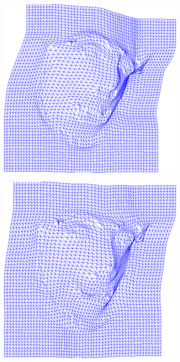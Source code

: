 \begin{figure}[t!]
\begin{subfigure}[b]{0.15\textwidth}
    \end{subfigure}
    \hfill
    \begin{subfigure}[b]{0.15\textwidth}
            \includegraphics[width=\textwidth]{resources/Fig_Flows/4}
    \end{subfigure}
   	\hfill
    \begin{subfigure}[b]{0.15\textwidth}
            \includegraphics[width=\textwidth]{resources/Fig_Flows/5}

\end{subfigure}
\end{figure}
